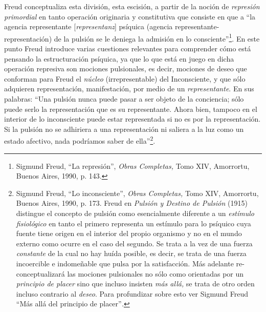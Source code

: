 Freud conceptualiza esta división, esta escisión, a partir de la noción de \emph{represión primordial} en tanto operación originaria y constitutiva que consiste en que a \enquote{la agencia representante {[}\emph{representanz}{]} psíquica (agencia representante-representación) de la pulsión se le deniega la admisión en lo consciente}\footnote{Sigmund Freud, \enquote{La represión}, \emph{Obras Completas,} Tomo XIV, Amorrortu, Buenos Aires, 1990, p. 143.}. En este punto Freud introduce varias cuestiones relevantes para comprender cómo está pensando la estructuración psíquica, ya que lo que está en juego en dicha operación represiva son mociones pulsionales, es decir, mociones de deseo que conforman para Freud el \emph{núcleo} (irrepresentable) del Inconsciente, y que sólo adquieren representación, manifestación, por medio de un \emph{representante}. En sus palabras: \enquote{Una pulsión nunca puede pasar a ser objeto de la conciencia; sólo puede serlo la representación que es su representante. Ahora bien, tampoco en el interior de lo inconsciente puede estar representada si no es por la representación. Si la pulsión no se adhiriera a una representación ni saliera a la luz como un estado afectivo, nada podríamos saber de ella}\footnote{Sigmund Freud, \enquote{Lo inconsciente}, \emph{Obras Completas,} Tomo XIV, Amorrortu, Buenos Aires, 1990, p. 173. Freud en \emph{Pulsión y Destino de Pulsión} (1915) distingue el concepto de pulsión como esencialmente diferente a un \emph{estímulo fisiológico} en tanto el primero representa un estímulo para lo psíquico cuya fuente tiene origen en el interior del propio organismo y no en el mundo externo como ocurre en el caso del segundo. Se trata a la vez de una fuerza \emph{constante} de la cual no hay huída posible, es decir, se trata de una fuerza incoercible e indomeñable que pulsa por la satisfacción. Más adelante re-conceptualizará las mociones pulsionales no sólo como orientadas por un \emph{principio de placer} sino que incluso insisten \emph{más allá,} se trata de otro orden incluso contrario al \emph{deseo}. Para profundizar sobre esto ver Sigmund Freud \enquote{Más allá del principio de placer}\emph{.}}.


